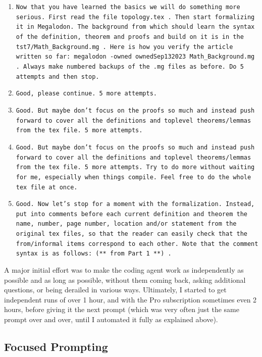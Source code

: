\documentclass[a4paper,UKenglish,cleveref, autoref, thm-restate]{lipics-v2021}
\begin{document}
\begin{enumerate}
\item \texttt{Now that you have learned the basics we will do something more serious. First  read the file topology.tex . Then start formalizing it in Megalodon. The background from which should  learn the syntax of the definition, theorem and proofs and build on it is in the tst7/Math\_Background.mg . Here is  how you verify the article written so far: megalodon -owned ownedSep132023 Math\_Background.mg . Always make  numbered backups of the .mg files as before. Do 5 attempts and then stop.}
\item \texttt{Good, please continue. 5 more attempts.}
\item \texttt{Good. But maybe don't focus on the proofs so much and instead push forward to cover all the definitions and toplevel theorems/lemmas from the tex file. 5 more attempts.}
\item \texttt{Good. But maybe don't focus on the proofs so much and instead push forward to cover all the definitions and toplevel theorems/lemmas from the tex file. 5 more attempts. Try to do more without waiting for me, especially when things compile. Feel free to do the whole tex file at once.}
\item \texttt{Good. Now let's stop for a moment with the formalization. Instead, put into comments before each current definition and theorem the name, number, page number, location and/or statement from the original tex files, so that the reader can easily check that the from/informal items correspond to each other. Note that the comment syntax is as follows: (** from Part 1 **) .}
\end{enumerate}


A major initial effort was to make the coding agent work as independently as
possible and as long as possible, without them coming back, asking additional
questions, or being derailed in various ways. Ultimately, I started to get
independent runs of over 1 hour, and with the Pro subscription sometimes even 2
hours, before giving it the next prompt (which was very often just the same
prompt over and over, until I automated it fully as explained above).

\subsection{Focused Prompting}
\end{document}
